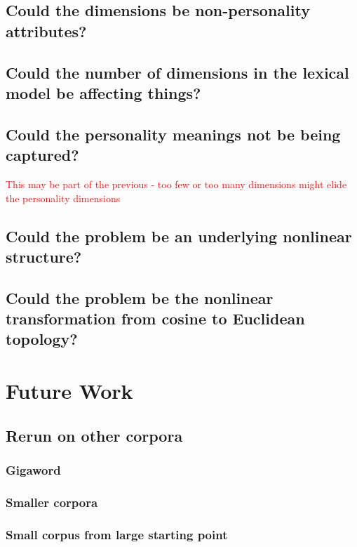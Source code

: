 \documentclass[10pt,letterpaper]{book}
\newcommand{\todo}[1]{\textcolor{red}{#1}}
\begin{document}
\section{Could the dimensions be non-personality attributes?}

\section{Could the number of dimensions in the lexical model be affecting things?}

\section{Could the personality meanings not be being captured?}

\todo{This may be part of the previous - too few or too many dimensions might elide the personality dimensions}

\section{Could the problem be an underlying nonlinear structure?}

\section{Could the problem be the nonlinear transformation from cosine to Euclidean topology?}

\chapter{Future Work}

\section{Rerun on other corpora}

\subsection{Gigaword}
\subsection{Smaller corpora}
\subsection{Small corpus from large starting point}
\end{document}
